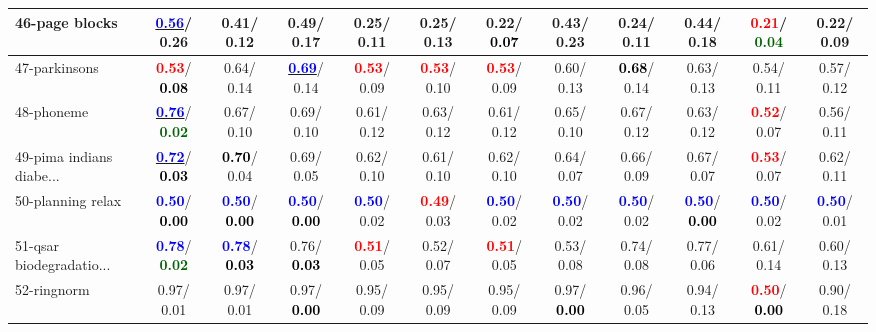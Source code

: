 \begin{table}[h]
\begin{center}
{\begin{tabular}{lc|c|c|c|c|c|c|c|c|c|c}
46-page blocks & \underline{\textcolor{blue}{\textbf{  0.56}}}/  0.26 &   0.41/  0.12 &   0.49/  0.17 &   0.25/  0.11 &   0.25/  0.13 &   0.22/\textcolor{black}{\textbf{  0.07}} &   0.43/  0.23 &   0.24/  0.11 &   0.44/  0.18 & \textcolor{red}{\textbf{  0.21}}/\textcolor{darkgreen}{\textbf{  0.04}} &   0.22/  0.09 \\ \hline
47-parkinsons & \textcolor{red}{\textbf{  0.53}}/\textcolor{black}{\textbf{  0.08}} &   0.64/  0.14 & \underline{\textcolor{blue}{\textbf{  0.69}}}/  0.14 & \textcolor{red}{\textbf{  0.53}}/  0.09 & \textcolor{red}{\textbf{  0.53}}/  0.10 & \textcolor{red}{\textbf{  0.53}}/  0.09 &   0.60/  0.13 & \textcolor{black}{\textbf{  0.68}}/  0.14 &   0.63/  0.13 &   0.54/  0.11 &   0.57/  0.12 \\
48-phoneme & \underline{\textcolor{blue}{\textbf{  0.76}}}/\textcolor{darkgreen}{\textbf{  0.02}} &   0.67/  0.10 &   0.69/  0.10 &   0.61/  0.12 &   0.63/  0.12 &   0.61/  0.12 &   0.65/  0.10 &   0.67/  0.12 &   0.63/  0.12 & \textcolor{red}{\textbf{  0.52}}/  0.07 &   0.56/  0.11 \\
49-pima indians diabe... & \underline{\textcolor{blue}{\textbf{  0.72}}}/\textcolor{black}{\textbf{  0.03}} & \textcolor{black}{\textbf{  0.70}}/  0.04 &   0.69/  0.05 &   0.62/  0.10 &   0.61/  0.10 &   0.62/  0.10 &   0.64/  0.07 &   0.66/  0.09 &   0.67/  0.07 & \textcolor{red}{\textbf{  0.53}}/  0.07 &   0.62/  0.11 \\
50-planning relax & \textcolor{blue}{\textbf{  0.50}}/\textcolor{black}{\textbf{  0.00}} & \textcolor{blue}{\textbf{  0.50}}/\textcolor{black}{\textbf{  0.00}} & \textcolor{blue}{\textbf{  0.50}}/\textcolor{black}{\textbf{  0.00}} & \textcolor{blue}{\textbf{  0.50}}/  0.02 & \textcolor{red}{\textbf{  0.49}}/  0.03 & \textcolor{blue}{\textbf{  0.50}}/  0.02 & \textcolor{blue}{\textbf{  0.50}}/  0.02 & \textcolor{blue}{\textbf{  0.50}}/  0.02 & \textcolor{blue}{\textbf{  0.50}}/\textcolor{black}{\textbf{  0.00}} & \textcolor{blue}{\textbf{  0.50}}/  0.02 & \textcolor{blue}{\textbf{  0.50}}/  0.01 \\
51-qsar biodegradatio... & \textcolor{blue}{\textbf{  0.78}}/\textcolor{darkgreen}{\textbf{  0.02}} & \textcolor{blue}{\textbf{  0.78}}/\textcolor{black}{\textbf{  0.03}} &   0.76/\textcolor{black}{\textbf{  0.03}} & \textcolor{red}{\textbf{  0.51}}/  0.05 &   0.52/  0.07 & \textcolor{red}{\textbf{  0.51}}/  0.05 &   0.53/  0.08 &   0.74/  0.08 &   0.77/  0.06 &   0.61/  0.14 &   0.60/  0.13 \\
52-ringnorm &   0.97/  0.01 &   0.97/  0.01 &   0.97/\textcolor{black}{\textbf{  0.00}} &   0.95/  0.09 &   0.95/  0.09 &   0.95/  0.09 &   0.97/\textcolor{black}{\textbf{  0.00}} &   0.96/  0.05 &   0.94/  0.13 & \textcolor{red}{\textbf{  0.50}}/\textcolor{black}{\textbf{  0.00}} &   0.90/  0.18 \\

\end{tabular}}
\end{center}
\end{table}
